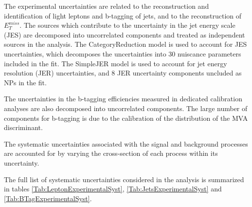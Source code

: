 The experimental uncertainties are related to the reconstruction and identification of light leptons and b-tagging of jets, and to the reconstruction of $E^{miss}_T$. The sources which contribute to the uncertainty in the jet energy scale (JES) \cite{jes} are decomposed into uncorrelated components and treated as independent sources in the analysis. The CategoryReduction model is used to account for JES uncertainties, which decomposes the uncertainties into 30 nuiscance parameters included in the fit. The SimpleJER model is used to account for jet energy resolution (JER) uncertainties, and 8 JER uncertainty components uncluded as NPs in the fit. 

The uncertainties in the b-tagging efficiencies measured in dedicated calibration analyses \cite{btag_cal} are also decomposed into uncorrelated components. The large number of components for b-tagging is due to the calibration of the distribution of the MVA discriminant.  

The systematic uncertainties associated with the signal and background processes are accounted for by varying the cross-section of each process within its uncertainty.

The full list of systematic uncertainties considered in the analysis is summarized in tables
\ref{Tab:LeptonExperimentalSyst}, \ref{Tab:JetsExperimentalSyst} and \ref{Tab:BTagExperimentalSyst}.

